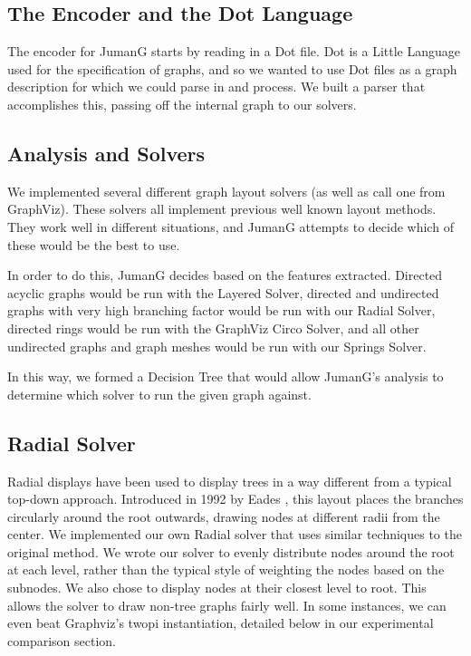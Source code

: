 \documentclass{article}
\begin{document}
\subsection{The Encoder and the Dot Language}
The encoder for JumanG starts by reading in a Dot file. 
Dot is a Little Language used for the specification of graphs, and so we wanted to use Dot files as a graph description for which we could parse in and process.
We built a parser that accomplishes this, passing off the internal graph to our solvers.


\subsection{Analysis and Solvers}
We implemented several different graph layout solvers (as well as call one from GraphViz). These solvers all implement previous well known layout methods. They work well in different situations, and JumanG attempts to decide which of these would be the best to use.

In order to do this, JumanG decides based on the features extracted. Directed acyclic graphs would be run with the Layered Solver, directed and undirected graphs with very high branching factor would be run with our Radial Solver, directed rings would be run with the GraphViz Circo Solver, and all other undirected graphs and graph meshes would be run with our Springs Solver. 

In this way, we formed a Decision Tree that would allow JumanG's analysis to determine which solver to run the given graph against.


\subsection{Radial Solver}
Radial displays have been used to display trees in a way different from a typical top-down approach.
Introduced in 1992 by Eades \cite{freeTrees}, this layout places the branches circularly around the root outwards, drawing 
nodes at different radii from the center. We implemented our own Radial solver that uses similar techniques to the original
method. We wrote our solver to evenly distribute nodes around the root at each level, rather than the typical style of weighting 
the nodes based on the subnodes. We also chose to display nodes at their closest level to root. 
This allows the solver to draw non-tree graphs fairly well. In some instances, we can even beat Graphviz's twopi instantiation, detailed below in our experimental comparison section. %
\end{document}
